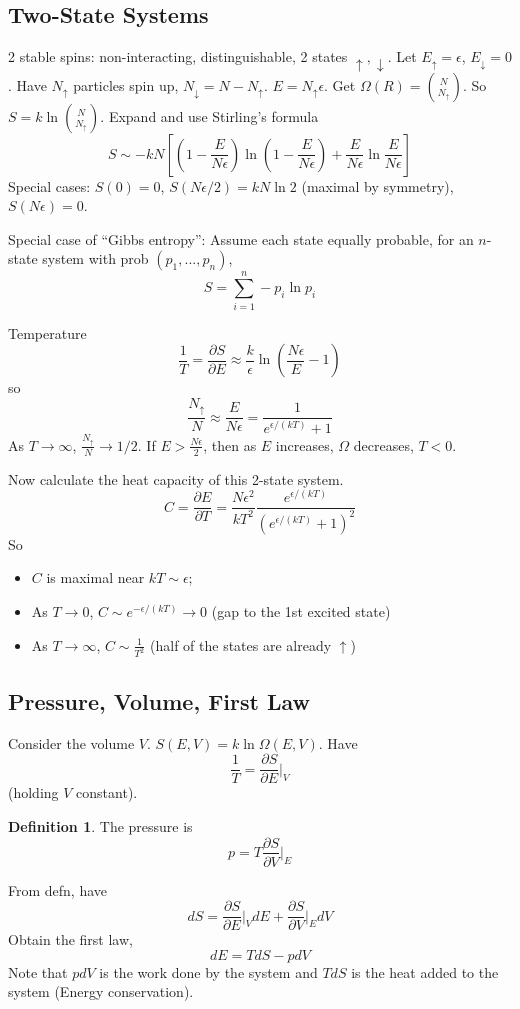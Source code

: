 \documentclass{article}
\theoremstyle{definition}
\newtheorem{defn}{Definition}[section]
\theoremstyle{remark}
\theoremstyle{plain}
\begin{document}
\subsection{Two-State Systems}
2 stable spins: non-interacting, distinguishable, 2 states $\uparrow,\downarrow$. Let $E_\uparrow=\epsilon$, $E_\downarrow=0$. Have $N_\uparrow$ particles spin up, $N_\downarrow=N-N_\uparrow$. $E=N_\uparrow\epsilon$. Get $\Omega(R)=\binom{N}{N_\uparrow}$. So $S=k\ln \binom{N}{N_\uparrow}$. Expand and use Stirling's formula
\[S\sim -kN\left[\left(1-\dfrac{E}{N\epsilon}\right)\ln\left(1-\dfrac{E}{N\epsilon}\right)+\dfrac{E}{N\epsilon}\ln\dfrac{E}{N\epsilon}\right]\]
Special cases: $S(0)=0$, $S(N\epsilon/2)=kN\ln 2$ (maximal by symmetry), $S(N\epsilon)=0$.

Special case of ``Gibbs entropy'': Assume each state equally probable, for an $n$-state system with prob $(p_1,...,p_n)$,
\[S=\sum_{i=1}^n-p_i\ln p_i\]

Temperature 
\[\dfrac{1}{T}=\dfrac{\partial S}{\partial E}\approx \dfrac{k}{\epsilon}\ln\left(\dfrac{N\epsilon}{E}-1\right)\]
so
\[\dfrac{N_\uparrow}{N}\approx\dfrac{E}{N\epsilon}=\dfrac{1}{e^{\epsilon/(kT)}+1}\]
As $T\to\infty$, $\frac{N_\uparrow}{N}\to 1/2$. If $E>\frac{N\epsilon}{2}$, then as $E$ increases, $\Omega$ decreases, $T<0$.

Now calculate the heat capacity of this 2-state system.
\[C=\dfrac{\partial E}{\partial T}=\dfrac{N\epsilon^2}{kT^2}\dfrac{e^{\epsilon/(kT)}}{(e^{\epsilon/(kT)}+1)^2}\]
So
\begin{itemize}
    \item $C$ is maximal near $kT\sim\epsilon$;
    \item As $T\to 0$, $C\sim e^{-\epsilon/(kT)}\to 0$ (gap to the 1st excited state)
    \item As $T\to \infty$, $C\sim \frac{1}{T^2}$ (half of the states are already $\uparrow$)
\end{itemize}
\subsection{Pressure, Volume, First Law}
Consider the volume $V$. $S(E,V)=k\ln\Omega(E,V)$. Have
\[\dfrac 1T=\dfrac{\partial S}{\partial E}\Bigg|_V\]
(holding $V$ constant).
\begin{defn}
    The pressure is \[p=T\dfrac{\partial S}{\partial V}\Bigg|_E\]
\end{defn}
From defn, have
\[dS=\dfrac{\partial S}{\partial E}\Bigg|_VdE+\dfrac{\partial S}{\partial V}\Bigg|_EdV\]
Obtain the first law,
\[dE=TdS-pdV\]
Note that $pdV$ is the work done by the system and $TdS$ is the heat added to the system (Energy conservation).
\end{document}

